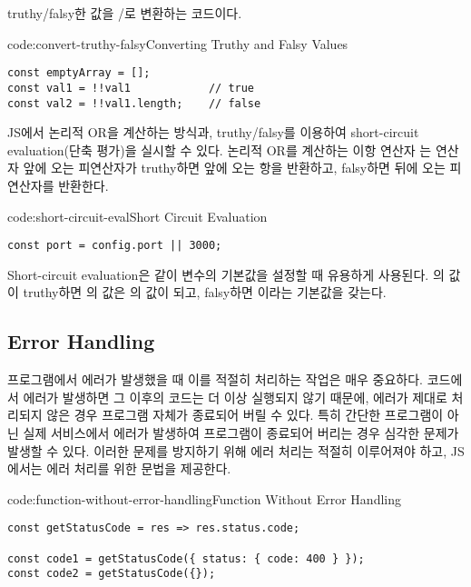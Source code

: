 \는 truthy/falsy한 값을 /로 변환하는 코드이다.

\begin{codeenv}{code:convert-truthy-falsy}{Converting Truthy and Falsy Values}\begin{verbatim}
const emptyArray = [];
const val1 = !!val1            // true
const val2 = !!val1.length;    // false
\end{verbatim}
\end{codeenv}

JS에서 논리적 OR을 계산하는 방식과, truthy/falsy를 이용하여 short-circuit evaluation(단축 평가)을 실시할 수 있다. 논리적 OR를 계산하는 이항 연산자 \cd{||}는 연산자 앞에 오는 피연산자가 truthy하면 앞에 오는 항을 반환하고, falsy하면 뒤에 오는 피연산자를 반환한다.

\begin{codeenv}{code:short-circuit-eval}{Short Circuit Evaluation}\begin{verbatim}
const port = config.port || 3000;
\end{verbatim}
\end{codeenv}

Short-circuit evaluation은 \과 같이 변수의 기본값을 설정할 때 유용하게 사용된다. 의 값이 truthy하면 의 값은 의 값이 되고, falsy하면 이라는 기본값을 갖는다.
\newpage

\subsection*{Error Handling}

프로그램에서 에러가 발생했을 때 이를 적절히 처리하는 작업은 매우 중요하다. 코드에서 에러가 발생하면 그 이후의 코드는 더 이상 실행되지 않기 때문에, 에러가 제대로 처리되지 않은 경우 프로그램 자체가 종료되어 버릴 수 있다. 특히 간단한 프로그램이 아닌 실제 서비스에서 에러가 발생하여 프로그램이 종료되어 버리는 경우 심각한 문제가 발생할 수 있다. 이러한 문제를 방지하기 위해 에러 처리는 적절히 이루어져야 하고, JS에서는 에러 처리를 위한 문법을 제공한다.

\begin{codeenv}{code:function-without-error-handling}{Function Without Error Handling}\begin{verbatim}
const getStatusCode = res => res.status.code;

const code1 = getStatusCode({ status: { code: 400 } });
const code2 = getStatusCode({});
\end{verbatim}
\end{codeenv}

